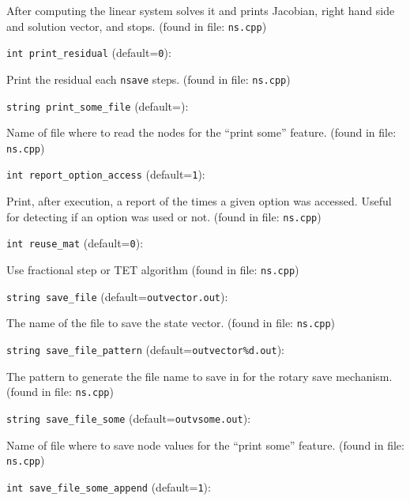After computing the linear system solves it and prints Jacobian,
right hand side and solution vector, and stops. 
 (found in file: \verb+ns.cpp+)
\item\verb+int print_residual+ {\rm(default=\verb|0|)}:

Print the residual each \verb+nsave+ steps. 
 (found in file: \verb+ns.cpp+)
\item\verb+string print_some_file+ {\rm(default=\verb||)}:

Name of file where to read the nodes for the ``print some'' 
feature. 
 (found in file: \verb+ns.cpp+)
\item\verb+int report_option_access+ {\rm(default=\verb|1|)}:

Print, after execution, a report of the times a given option
was accessed. Useful for detecting if an option was used or not.
 (found in file: \verb+ns.cpp+)
\item\verb+int reuse_mat+ {\rm(default=\verb|0|)}:

Use fractional step or TET algorithm
 (found in file: \verb+ns.cpp+)
\item\verb+string save_file+ {\rm(default=\verb|outvector.out|)}:

The name of the file to save the state vector. 
 (found in file: \verb+ns.cpp+)
\item\verb+string save_file_pattern+ {\rm(default=\verb|outvector%d.out|)}:

The pattern to generate the file name to save in for
the rotary save mechanism.
 (found in file: \verb+ns.cpp+)
\item\verb+string save_file_some+ {\rm(default=\verb|outvsome.out|)}:

Name of file where to save node values for the ``print some'' 
feature. 
 (found in file: \verb+ns.cpp+)
\item\verb+int save_file_some_append+ {\rm(default=\verb|1|)}:

